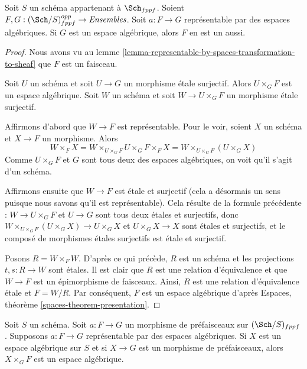 \begin{lemma}
\label{lemma-representable-by-spaces-over-space}
Soit $S$ un schéma appartenant à $\Sch_{fppf}$.
Soient $F, G : (\Sch/S)_{fppf}^{opp} \to \textit{Ensembles}$.
Soit $a : F \to G$ représentable par des espaces algébriques.
Si $G$ est un espace algébrique, alors $F$ en est un aussi.
\end{lemma}

\begin{proof}
Nous avons vu au
lemme \ref{lemma-representable-by-spaces-transformation-to-sheaf}
que $F$ est un faisceau.

\medskip\noindent
Soit $U$ un schéma et soit $U \to G$ un morphisme étale surjectif.
Alors $U \times_G F$ est un espace algébrique. Soit $W$ un schéma
et soit $W \to U \times_G F$ un morphisme étale surjectif.

\medskip\noindent
Affirmons d'abord que $W \to F$ est représentable.
Pour le voir, soient $X$ un schéma et $X \to F$ un morphisme.
Alors
$$
W \times_F X = W \times_{U \times_G F} U \times_G F \times_F X
= W \times_{U \times_G F} (U \times_G X)
$$
Comme $U \times_G F$ et $G$ sont tous deux des espaces algébriques, on voit
qu'il s'agit d'un schéma.

\medskip\noindent
Affirmons ensuite que $W \to F$ est étale et surjectif (cela a désormais
un sens puisque nous savons qu'il est représentable). Cela résulte de la
formule précédente : $W \to U \times_G F$ et $U \to G$
sont tous deux étales et surjectifs, donc
$W \times_{U \times_G F} (U \times_G X) \to U \times_G X$ et
$U \times_G X \to X$ sont étales et surjectifs, et le composé de
morphismes étales surjectifs est étale et surjectif.

\medskip\noindent
Posons $R = W \times_F W$. D'après ce qui précède, $R$ est un schéma et
les projections $t, s : R \to W$
sont étales. Il est clair que $R$ est une relation d'équivalence et que
$W \to F$ est un épimorphisme de faisceaux. Ainsi, $R$ est une relation
d'équivalence étale et $F = W/R$. Par conséquent, $F$ est un espace algébrique d'après
Espaces,
théorème \ref{spaces-theorem-presentation}.
\end{proof}

\begin{lemma}
\label{lemma-representable-by-spaces}
Soit $S$ un schéma.
Soit $a : F \to G$ un morphisme de préfaisceaux sur $(\Sch/S)_{fppf}$.
Supposons $a : F \to G$ représentable par des espaces algébriques.
Si $X$ est un espace algébrique sur $S$ et si $X \to G$ est un morphisme de préfaisceaux,
alors $X \times_G F$ est un espace algébrique.
\end{lemma}

